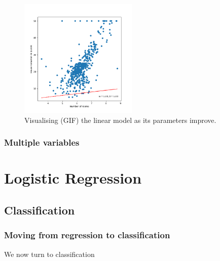 \documentclass[10pt]{beamer}
\begin{document}
\begin{figure}[htbp]
\centering
\includegraphics[width=0.5\textwidth]{images/lm_learn.gif}
\caption{\label{fig:lm_learn}Visualising (GIF) the linear model as its parameters improve.}
\end{figure}


\subsubsection*{Multiple variables}
\label{sec:orgf24f01d}

\section*{Logistic Regression}
\label{sec:orgcc4ced2}

\subsection*{Classification}
\label{sec:org584b67d}

\subsubsection*{Moving from regression to classification}
\label{sec:org8f320bd}

We now turn to classification
\end{document}
